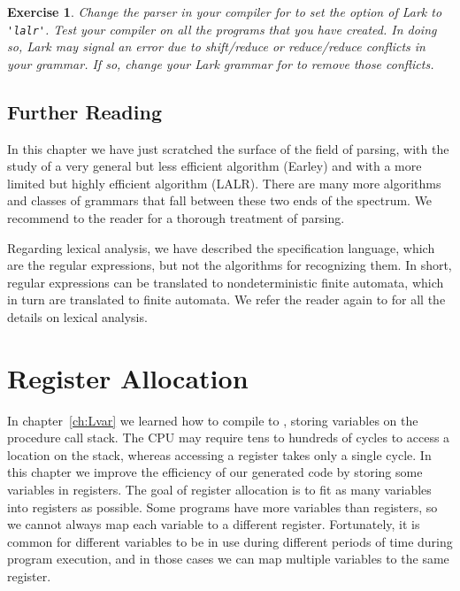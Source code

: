 \documentclass[7x10]{TimesAPriori_MIT}%
\newtheorem{exercise}[theorem]{Exercise}
\numberwithin{theorem}{chapter}
\numberwithin{definition}{chapter}
\numberwithin{equation}{chapter}
\begin{document}
{\begin{exercise}
  \normalfont\normalsize
%
  Change the parser in your compiler for \LangVar{} to set the
   option of Lark to \lstinline{'lalr'}. Test your compiler on
  all the \LangVar{} programs that you have created. In doing so, Lark
  may signal an error due to shift/reduce or reduce/reduce conflicts
  in your grammar. If so, change your Lark grammar for \LangVar{} to
  remove those conflicts.
\end{exercise}


\section{Further Reading}

In this chapter we have just scratched the surface of the field of
parsing, with the study of a very general but less efficient algorithm
(Earley) and with a more limited but highly efficient algorithm
(LALR). There are many more algorithms and classes of grammars that
fall between these two ends of the spectrum. We recommend to the reader
\citet{Aho:2006wb} for a thorough treatment of parsing.

Regarding lexical analysis, we have described the specification
language, which are the regular expressions, but not the algorithms
for recognizing them. In short, regular expressions can be translated
to nondeterministic finite automata, which in turn are translated to
finite automata.  We refer the reader again to \citet{Aho:2006wb} for
all the details on lexical analysis.

\fi}

\chapter{Register Allocation}
\label{ch:register-allocation-Lvar}
\setcounter{footnote}{0}


In chapter~\ref{ch:Lvar} we learned how to compile \LangVar{} to {\ArchName},
storing variables on the procedure call stack.  The CPU may require tens
to hundreds of cycles to access a location on the stack, whereas
accessing a register takes only a single cycle. In this chapter we
improve the efficiency of our generated code by storing some variables
in registers. The goal of register allocation is to fit as many
variables into registers as possible. Some programs have more
variables than registers, so we cannot always map each variable to a
different register. Fortunately, it is common for different variables
to be in use during different periods of time during program
execution, and in those cases we can map multiple variables to the
same register.
\end{document}
